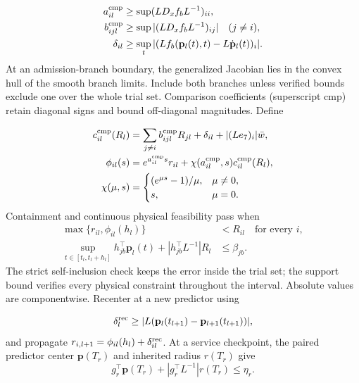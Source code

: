 \documentclass[preprint,12pt]{elsarticle}
\theoremstyle{definition}
\theoremstyle{plain}
\theoremstyle{definition}
\theoremstyle{plain}
\begin{document}
\begin{equation}
 \begin{aligned}
 a_{il}^{\rm cmp}&\ge\sup (L D_xf_b L^{-1})_{ii},\\
 b_{ijl}^{\rm cmp}&\ge\sup |(L D_xf_b L^{-1})_{ij}|\quad(j\ne i),\\
 \delta_{il}&\ge\sup_t |(L f_b(\mathbf{p}_l(t),t)-L\dot{\mathbf{p}}_l(t))_i|.
 \end{aligned}
 \label{eq:new-local-bounds}
\end{equation}
At an admission-branch boundary, the generalized Jacobian lies in the
convex hull of the smooth branch limits. Include both branches unless
verified bounds exclude one over the whole trial set. Comparison
coefficients (superscript $\mathrm{cmp}$) retain diagonal signs and bound
off-diagonal magnitudes. Define

\begin{align}
 c_{il}^{\rm cmp}(R_l)&=\sum_{j\ne i}b_{ijl}^{\rm cmp}R_{jl}
                  +\delta_{il}+|(Le_7)_i|\bar w,\nonumber\\
 \phi_{il}(s)&=e^{a_{il}^{\rm cmp}s}r_{il}
                   +\chi(a_{il}^{\rm cmp},s)c_{il}^{\rm cmp}(R_l),\nonumber\\
 \chi(\mu,s)&=\begin{cases}(e^{\mu s}-1)/\mu,&\mu\ne0,\\s,&\mu=0.\end{cases}
 \label{eq:new-component-comparison}
\end{align}
Containment and continuous physical feasibility pass when
\begin{align}
 \max\{r_{il},\phi_{il}(h_l)\}&<R_{il}\quad\text{for every }i,
 \label{eq:new-self-inclusion}\\
 \sup_{t\in[t_l,t_l+h_l]}h_{jb}^\top \mathbf{p}_l(t)
       +|h_{jb}^\top L^{-1}|R_l&\le\beta_{jb}.
 \label{eq:new-affine-support}
\end{align}
The strict self-inclusion check keeps the error inside the trial set;
the support bound verifies every physical constraint throughout the
interval. Absolute values are componentwise. Recenter at a new predictor
using

\begin{equation}
 \delta^{\rm rec}_l\ge
 |L(\mathbf{p}_l(t_{l+1})-\mathbf{p}_{l+1}(t_{l+1}))|,
 \label{eq:new-recentering-bound}
\end{equation}
and propagate $r_{i,l+1}=\phi_{il}(h_l)+\delta^{\rm rec}_{il}$. At a service checkpoint, the paired predictor center $\mathbf p(T_r)$
and inherited radius $r(T_r)$ give
\begin{equation}
 g_r^\top\mathbf p(T_r)+|g_r^\top L^{-1}|r(T_r)\le\eta_r.
 \label{eq:new-service-support}
\end{equation}
\end{document}
